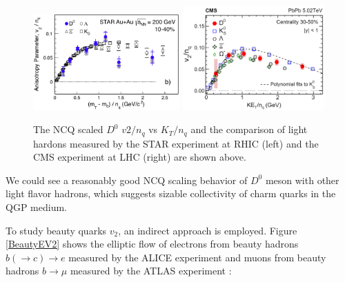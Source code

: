 \begin{figure}[hbtp]
\begin{center}
\includegraphics[width=0.50\textwidth]{Figures/Chapter2/STARv2.png}
\includegraphics[width=0.485\textwidth]{Figures/Chapter2/CMSv2.png}
\caption{The NCQ scaled $D^0$ $v2/n_q$ vs $K_T/n_q$ and the comparison of light hardons measured by the STAR experiment at RHIC (left) and the CMS experiment at LHC (right) are shown above.}
\label{HQV2}
\end{center}
\end{figure}   

We could see a reasonably good NCQ scaling behavior of $D^0$ meson with other light flavor hadrons, which suggests sizable collectivity of charm quarks in the QGP medium. 

To study beauty quarks $v_2$, an indirect approach is employed. Figure \ref{BeautyEV2} shows the elliptic flow of electrons from beauty hadrons $b (\rightarrow c) \rightarrow e$ measured by the ALICE experiment \cite{ALICENPElec} and muons from beauty hadrons $b \rightarrow \mu$ measured by the ATLAS experiment \cite{ATLASNPMuon}:


